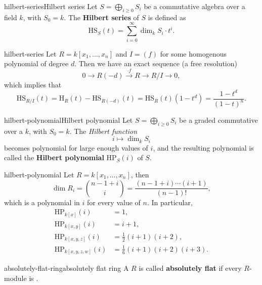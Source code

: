 \begin{topic}{hilbert-series}{Hilbert series}
    Let $S = \bigoplus_{i \ge 0} S_i$ be a   commutative algebra over a field $k$, with $S_0 = k$. The \textbf{Hilbert series} of $S$ is defined as
    \[ \text{HS}_S(t) = \sum_{i = 0}^{\infty} \dim_k S_i \cdot t^i . \]
\end{topic}

\begin{example}{hilbert-series}
    Let $R = k[x_1, \ldots, x_n]$ and $I = (f)$ for some homogenous polynomial of degree $d$. Then we have an exact sequence (a free resolution)
    \[ 0 \to R(-d) \xrightarrow{\cdot f} R \to R / I \to 0 , \]
    which implies that
    \[ \text{HS}_{R/I}(t) = \text{H}_R(t) - \text{HS}_{R(-d)}(t) = \text{HS}_R(t) (1 - t^d) = \frac{1 - t^d}{(1 - t)^n}. \]
\end{example}

\begin{topic}{hilbert-polynomial}{Hilbert polynomial}
    Let $S = \bigoplus_{i \ge 0} S_i$ be a  graded commutative  over a  $k$, with $S_0 = k$. The \textit{Hilbert function}
    \[ i \mapsto \dim_k S_i \]
    becomes polynomial for large enough values of $i$, and the resulting polynomial is called the \textbf{Hilbert polynomial} $\text{HP}_S(i)$ of $S$.
\end{topic}

\begin{example}{hilbert-polynomial}
    Let $R = k[x_1, \ldots, x_n]$, then
    \[ \dim R_i = \binom{n - 1 + i}{i} = \frac{(n - 1 + i) \cdots (i + 1)}{(n - 1)!} , \]
    which is a polynomial in $i$ for every value of $n$. In particular,
    \[ \begin{aligned}
        \text{HP}_{k[x]}(i) &= 1, \\
        \text{HP}_{k[x, y]}(i) &= i + 1, \\
        \text{HP}_{k[x, y, z]}(i) &= \tfrac{1}{2} (i + 1)(i + 2), \\
        \text{HP}_{k[x, y, z, w]}(i) &= \tfrac{1}{6} (i + 1)(i + 2)(i + 3) .
    \end{aligned} \]
\end{example}

\begin{topic}{absolutely-flat-ring}{absolutely flat ring}
    A  $R$ is called \textbf{absolutely flat} if every $R$-module is .
\end{topic}

